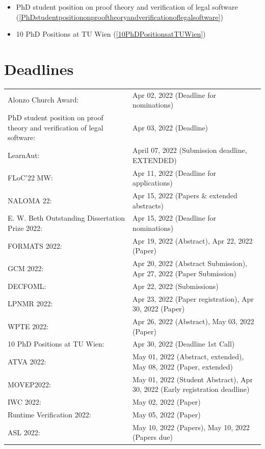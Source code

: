 \documentclass[prodmode,acmtecs]{acmsmall} %
\begin{document}
\begin{itemize}
\begin{itemize}\item PhD student position on proof theory and verification of legal software (\cref{PhDstudentpositiononprooftheoryandverificationoflegalsoftware})
\item 10 PhD Positions at TU Wien (\cref{10PhDPositionsatTUWien})
\end{itemize} 
\end{itemize}\section{Deadlines}\label{deadlines}\begin{tabulary}{\linewidth}{LL}Alonzo Church Award:  & Apr 02, 2022 (Deadline for nominations) \\
PhD student position on proof theory and verification of legal software:  & Apr 03, 2022 (Deadline) \\
LearnAut:  & April 07, 2022 (Submission deadline, EXTENDED) \\
FLoC'22 MW:  & Apr 11, 2022 (Deadline for applications) \\
NALOMA 22:  & Apr 15, 2022 (Papers \& extended abstracts) \\
E. W. Beth Outstanding Dissertation Prize 2022:  & Apr 15, 2022 (Deadline for nominations) \\
FORMATS 2022:  & Apr 19, 2022 (Abstract), Apr 22, 2022 (Paper) \\
GCM 2022:  & Apr 20, 2022 (Abstract Submission), Apr 27, 2022 (Paper Submission) \\
DECFOML:  & Apr 22, 2022 (Submissions) \\
LPNMR 2022:  & Apr 23, 2022 (Paper registration), Apr 30, 2022 (Paper) \\
WPTE 2022:  & Apr 26, 2022 (Abstract), May 03, 2022 (Paper) \\
10 PhD Positions at TU Wien:  & Apr 30, 2022 (Deadline 1st Call) \\
ATVA 2022:  & May 01, 2022 (Abstract, extended), May 08, 2022 (Paper, extended) \\
MOVEP2022:  & May 01, 2022 (Student Abstract), Apr 30, 2022 (Early registration deadline) \\
IWC 2022:  & May 02, 2022 (Paper) \\
Runtime Verification 2022:  & May 05, 2022 (Paper) \\
ASL 2022:  & May 10, 2022 (Papers), May 10, 2022 (Papers due) \\

\end{tabulary}
\end{document}
